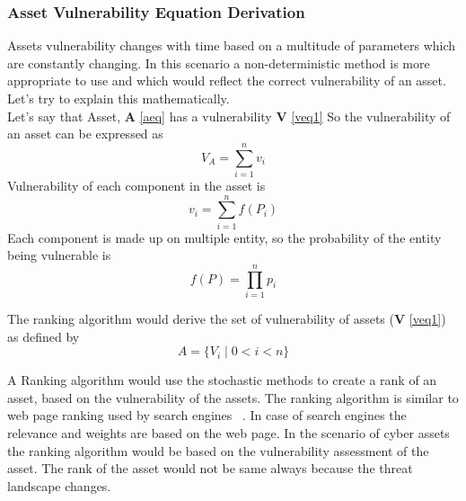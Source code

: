 \subsubsection{Asset Vulnerability Equation Derivation}\label{sec:stochs}
Assets vulnerability changes with time based on a multitude of parameters which are constantly changing. In this scenario a non-deterministic method is more appropriate to use and which would reflect the correct vulnerability of an asset. Let's try to explain this mathematically.\\ 
\noindent Let's say that Asset, \textbf{A} \eqref{aeq}  has a vulnerability \textbf{V} \eqref{veq1}
\noindent So the vulnerability of an asset can be expressed as
\begin{equation}\label{veq1}
      V_A = \sum_{i=1}^{n} v_i
\end{equation}
\noindent Vulnerability of each component in the asset is
\begin{equation}\label{veq2}
         v_i = \sum_{i=1}^{n} f(P_i)
\end{equation}
\noindent Each component is made up on multiple entity, so the probability of the entity being vulnerable is
\begin{equation}\label{veq3}
        f(P) =\prod_{i=1}^n p_{i}
\end{equation}

\noindent The ranking algorithm would derive the set of vulnerability of assets (\textbf{V} \eqref{veq1})  as defined by
\begin{equation}\label{aeq}
        A=\{V_i\mid 0 < i < n\}
\end{equation}

A Ranking algorithm would use the stochastic methods to create a rank of an asset, based on the vulnerability of the assets. The ranking algorithm is similar to web page ranking used by search engines ~\cite{Pageetal98}. In case of search engines the relevance and weights are based on the web page. In the scenario of cyber assets the ranking algorithm would be based on the vulnerability assessment of the asset. The rank of the asset would not be same always because the threat landscape changes.
